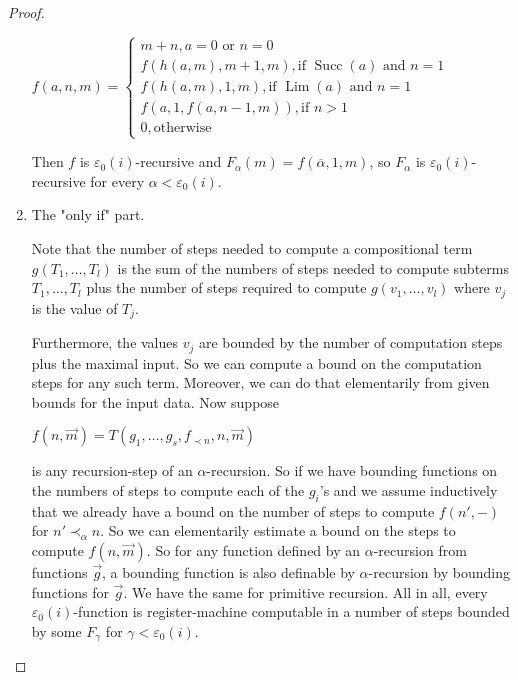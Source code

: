\documentclass[8pt]{article}
\theoremstyle{definition}
\theoremstyle{definition}
\theoremstyle{definition}
\theoremstyle{definition}
\theoremstyle{definition}
\theoremstyle{definition}
\theoremstyle{definition}
\theoremstyle{definition}
\theoremstyle{definition}
\theoremstyle{definition}
\theoremstyle{definition}
\theoremstyle{definition}
\theoremstyle{definition}
\theoremstyle{question}
\begin{document}
\begin{proof}
\begin{enumerate}
    \begin{center}
    $f(a, n, m) = \begin{cases}
      m + n, \text{$a = 0$ or $n = 0$} \\
      f(h(a, m), m + 1, m), \text{if $\operatorname{Succ}(a)$ and $n = 1$} \\
      f(h(a, m), 1, m), \text{if $\operatorname{Lim}(a)$ and $n = 1$} \\
      f(a, 1, f(a, n - 1, m)), \text{if $n > 1$} \\
      0, \text{otherwise}
    \end{cases}$
  \end{center}

    Then $f$ is $\varepsilon_0(i)$-recursive and $F_{\alpha}(m) = f(\overline{\alpha}, 1, m)$, so 
    $F_{\alpha}$ is $\varepsilon_0(i)$-recursive for every $\alpha < \varepsilon_0(i)$.
    \item The "only if" part.

    Note that the number of steps needed to compute a compositional term $g(T_1, \dots, T_l)$
    is the sum of the numbers of steps needed to compute subterms $T_1, \dots, T_l$ plus the number of steps
    required to compute $g(v_1, \dots, v_l)$ where $v_j$ is the value of $T_j$.

    Furthermore, the values $v_j$ are bounded by the number of computation steps plus the maximal input. 
    So we can compute a bound on the computation steps for any such term. 
    Moreover, we can do that elementarily from given bounds for the input data. Now suppose
    \begin{center}
      $f(n, \vec{m}) = T(g_1, \dots, g_s, f_{\prec n}, n, \vec{m})$
    \end{center}
    is any recursion-step of an $\alpha$-recursion. So if we have bounding functions on the numbers
    of steps to compute each of the $g_i$'s and we assume inductively that we already have a bound on the number
    of steps to compute $f(n',-)$ for $n' \prec_{\alpha} n$. So we can elementarily estimate a bound on the steps to compute
    $f(n, \vec{m})$. So for any function defined by an $\alpha$-recursion from functions $\vec{g}$, a bounding
    function is also definable by $\alpha$-recursion by bounding functions for $\vec{g}$. 
    We have the same for primitive recursion. All in all, every $\varepsilon_0(i)$-function is
    register-machine computable in a number of steps bounded by some $F_{\gamma}$ for $\gamma < \varepsilon_0(i)$.
  \end{enumerate}
\end{proof}
\end{document}
